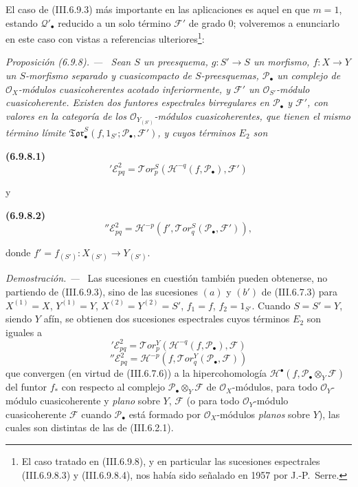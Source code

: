 \documentclass[10pt,oneside]{book}
\newcommand{\sref}[2][]{\textup{(#2)}}
\newenvironment{env}[1][]{\par\medskip\noindent\textbf{(#1)}\ }{\par}
\newenvironment{proposition}[1][]{\par\medskip\noindent\itshape Proposición (#1). ---\ }{\par}
\newenvironment{proof}{\par\medskip\noindent\textit{Demostración. ---\ }}{\par}
\begin{document}
El caso de \sref{III.6.9.3} más importante en las aplicaciones es aquel en
que $m=1$, estando $\mathscr Q'_\bullet$ reducido a un solo término
$\mathscr F'$ de grado $0$; volveremos a enunciarlo en este caso con vistas
a referencias ulteriores\footnote{El caso tratado en \sref{III.6.9.8}, y en
particular las sucesiones espectrales \sref{III.6.9.8.3} y
\sref{III.6.9.8.4}, nos había sido señalado en 1957 por J.-P.~Serre.}:

\begin{proposition}[6.9.8]
\label{III.6.9.8}
Sean $S$ un preesquema, $g:S'\to S$ un morfismo,
$f:X\to Y$ un $S$-morfismo separado y cuasicompacto de $S$-preesquemas,
$\mathscr P_\bullet$ un complejo de $\mathscr O_X$-módulos cuasicoherentes
acotado inferiormente, y $\mathscr F'$ un $\mathscr O_{S'}$-módulo
cuasicoherente. Existen dos funtores espectrales birregulares en
$\mathscr P_\bullet$ y $\mathscr F'$, con valores en la categoría de los
$\mathscr O_{Y_{(S')}}$-módulos cuasicoherentes, que tienen el mismo término
límite $\mathfrak{Tor}_\bullet^S(f,1_{S'};
\mathscr P_\bullet,\mathscr F')$, y cuyos términos $E_2$ son
\begin{env}[6.9.8.1]
\label{III.6.9.8.1}
\[
  {}'\mathscr E_{pq}^2
  =\mathscr{T}\!or_p^S
  (\mathscr H^{-q}(f,\mathscr P_\bullet),\mathscr F')
  \tag{6.9.8.1}\label{III.6.9.8.1.eq}
\]
\end{env}
y
\begin{env}[6.9.8.2]
\label{III.6.9.8.2}
\[
  {}''\mathscr E_{pq}^2
  =\mathscr H^{-p}
  (f',\mathscr{T}\!or_q^S(\mathscr P_\bullet,\mathscr F')),
  \tag{6.9.8.2}\label{III.6.9.8.2.eq}
\]
\end{env}
donde $f'=f_{(S')}:X_{(S')}\to Y_{(S')}$.
\end{proposition}

\begin{proof}
Las sucesiones en cuestión también pueden obtenerse, no partiendo de
\sref{III.6.9.3}, sino de las sucesiones $(a)$ y $(b')$ de
\sref{III.6.7.3} para $X^{(1)}=X$, $Y^{(1)}=Y$,
$X^{(2)}=Y^{(2)}=S'$, $f_1=f$, $f_2=1_{S'}$. Cuando $S=S'=Y$, siendo $Y$
afín, se obtienen dos sucesiones espectrales cuyos términos $E_2$ son iguales
a
\[
  {}'\mathscr E_{pq}^2
  =\mathscr{T}\!or_p^Y
  (\mathscr H^{-q}(f,\mathscr P_\bullet),\mathscr F)
  \tag{6.9.8.3}\label{III.6.9.8.3}
\]
\[
  {}''\mathscr E_{pq}^2
  =\mathscr H^{-p}
  (f,\mathscr{T}\!or_q^Y(\mathscr P_\bullet,\mathscr F))
  \tag{6.9.8.4}\label{III.6.9.8.4}
\]
que convergen (en virtud de \sref{III.6.7.6}) a la hipercohomología
$\mathscr H^\bullet(f,\mathscr P_\bullet\otimes_Y\mathscr F)$ del funtor
$f_*$ con respecto al complejo
$\mathscr P_\bullet\otimes_Y\mathscr F$ de $\mathscr O_X$-módulos, para todo
$\mathscr O_Y$-módulo cuasicoherente y \emph{plano} sobre $Y$, $\mathscr F$ (o para
todo $\mathscr O_Y$-módulo cuasicoherente $\mathscr F$ cuando
$\mathscr P_\bullet$ está formado por $\mathscr O_X$-módulos \emph{planos} sobre
$Y$), las cuales son distintas de las de \sref{III.6.2.1}.
\end{proof}
\end{document}
